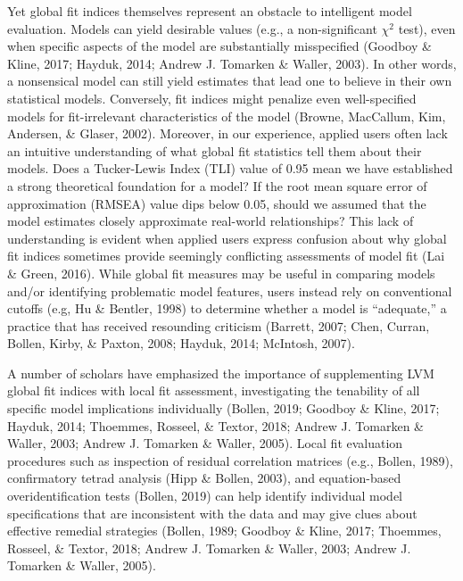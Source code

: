 \documentclass[
  english,
  man]{apa6}
\begin{document}
Yet global fit indices themselves represent an obstacle to intelligent model evaluation. Models can yield desirable values (e.g., a non-significant \(\chi^2\) test), even when specific aspects of the model are substantially misspecified (Goodboy \& Kline, 2017; Hayduk, 2014; Andrew J. Tomarken \& Waller, 2003). In other words, a nonsensical model can still yield estimates that lead one to believe in their own statistical models. Conversely, fit indices might penalize even well-specified models for fit-irrelevant characteristics of the model (Browne, MacCallum, Kim, Andersen, \& Glaser, 2002). Moreover, in our experience, applied users often lack an intuitive understanding of what global fit statistics tell them about their models. Does a Tucker-Lewis Index (TLI) value of 0.95 mean we have established a strong theoretical foundation for a model? If the root mean square error of approximation (RMSEA) value dips below 0.05, should we assumed that the model estimates closely approximate real-world relationships? This lack of understanding is evident when applied users express confusion about why global fit indices sometimes provide seemingly conflicting assessments of model fit (Lai \& Green, 2016). While global fit measures may be useful in comparing models and/or identifying problematic model features, users instead rely on conventional cutoffs (e.g, Hu \& Bentler, 1998) to determine whether a model is ``adequate,'' a practice that has received resounding criticism (Barrett, 2007; Chen, Curran, Bollen, Kirby, \& Paxton, 2008; Hayduk, 2014; McIntosh, 2007).

A number of scholars have emphasized the importance of supplementing LVM global fit indices with local fit assessment, investigating the tenability of all specific model implications individually (Bollen, 2019; Goodboy \& Kline, 2017; Hayduk, 2014; Thoemmes, Rosseel, \& Textor, 2018; Andrew J. Tomarken \& Waller, 2003; Andrew J. Tomarken \& Waller, 2005). Local fit evaluation procedures such as inspection of residual correlation matrices (e.g., Bollen, 1989), confirmatory tetrad analysis (Hipp \& Bollen, 2003), and equation-based overidentification tests (Bollen, 2019) can help identify individual model specifications that are inconsistent with the data and may give clues about effective remedial strategies (Bollen, 1989; Goodboy \& Kline, 2017; Thoemmes, Rosseel, \& Textor, 2018; Andrew J. Tomarken \& Waller, 2003; Andrew J. Tomarken \& Waller, 2005).
\end{document}
